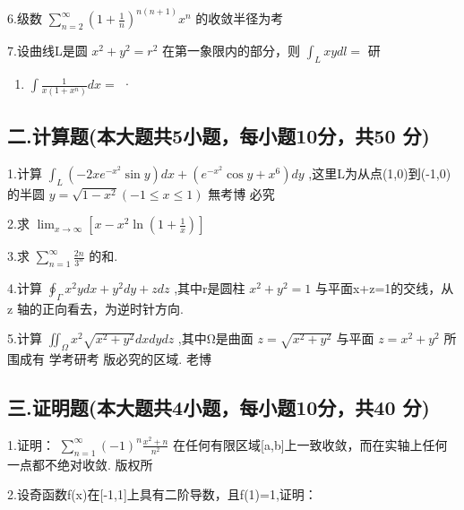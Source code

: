 \documentclass[11pt,fontset=fandol]{ctexart}
\providecommand{\tightlist}{\setlength{\itemsep}{0pt}\setlength{\parskip}{0pt}}
\begin{document}
6.级数
\(\sum _ { n = 2 } ^ { \infty } ( 1 + { \frac { 1 } { n } } ) ^ { n ( n + 1 ) } x ^ { n }\)
的收敛半径为考

7.设曲线L是圆 \(x ^ { 2 } + y ^ { 2 } = r ^ { 2 }\)
在第一象限内的部分，则 \(\int _ { L } x y d l =\) 研

\begin{enumerate}
\def\labelenumi{\arabic{enumi}.}
\setcounter{enumi}{7}
\tightlist
\item
  \(\int { \frac { 1 } { x ( 1 + x ^ { n } ) } } d x =\) ·
\end{enumerate}

\subsection{二.计算题(本大题共5小题，每小题10分，共50
分)}\label{ux4e8c.ux8ba1ux7b97ux9898ux672cux5927ux9898ux51715ux5c0fux9898ux6bcfux5c0fux989810ux5206ux517150-ux5206}

1.计算
\(\int _ { L } { ( - 2 x e ^ { - x ^ { 2 } } \sin y ) d x } + { ( e ^ { - x ^ { 2 } } \cos y + x ^ { 6 } ) d y }\)
,这里L为从点(1,0)到(-1,0) 的半圆
\(y = \sqrt { 1 - x ^ { 2 } } ( - 1 \leq x \leq 1 )\) 無考博 必究

2.求
\(\lim _ { x \to \infty } \left[ x - x ^ { 2 } \ln \left( 1 + { \frac { 1 } { x } } \right) \right]\)

3.求 \(\sum _ { n = 1 } ^ { \infty } { \frac { 2 n } { 3 ^ { n } } }\)
的和.

4.计算 \(\oint _ { \Gamma } x ^ { 2 } y d x + y ^ { 2 } d y + z d z\)
,其中r是圆柱 \(x ^ { 2 } + y ^ { 2 } = 1\) 与平面x+z=1的交线，从z
轴的正向看去，为逆时针方向.

5.计算
\(\iint _ { \Omega } { x ^ { 2 } \sqrt { { x ^ { 2 } + y ^ { 2 } } } d x d y d z }\)
,其中Ω是曲面 \(z = \sqrt { x ^ { 2 } + y ^ { 2 } }\) 与平面
\(z = x ^ { 2 } + y ^ { 2 }\) 所围成有 学考研考 版必究的区域. 老博

\subsection{三.证明题(本大题共4小题，每小题10分，共40
分)}\label{ux4e09.ux8bc1ux660eux9898ux672cux5927ux9898ux51714ux5c0fux9898ux6bcfux5c0fux989810ux5206ux517140-ux5206}

1.证明：
\(\sum _ { n = 1 } ^ { \infty } ( - 1 ) ^ { n } { \frac { x ^ { 2 } + n } { n ^ { 2 } } }\)
在任何有限区域{[}a,b{]}上一致收敛，而在实轴上任何一点都不绝对收敛.
版权所

2.设奇函数f(x)在{[}-1,1{]}上具有二阶导数，且f(1)=1,证明：
\end{document}
